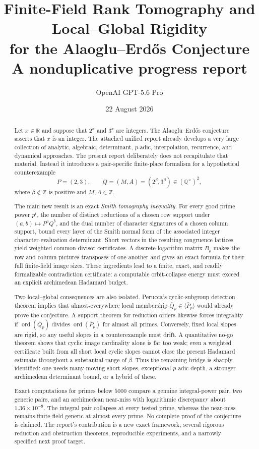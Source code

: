 \documentclass[11pt]{article}
\title{\bfseries Finite-Field Rank Tomography and Local--Global Rigidity\\[4pt]
for the Alaoglu--Erd\H{o}s Conjecture\\[10pt]
\large A nonduplicative progress report}
\author{OpenAI GPT-5.6 Pro}
\date{22 August 2026}
\theoremstyle{definition}
\theoremstyle{remark}
\newcommand{\Z}{\mathbb Z}
\newcommand{\Q}{\mathbb Q}
\newcommand{\R}{\mathbb R}
\newcommand{\ord}{\operatorname{ord}}
\begin{document}
\maketitle

\begin{abstract}
Let $x\in\R$ and suppose that $2^x$ and $3^x$ are integers.  The Alaoglu--Erd\H{o}s conjecture asserts that $x$ is an integer.  The attached unified report already develops a very large collection of analytic, algebraic, determinant, $p$-adic, interpolation, recurrence, and dynamical approaches.  The present report deliberately does not recapitulate that material.  Instead it introduces a pair-specific finite-place formalism for a hypothetical counterexample
\[
P=(2,3),\qquad Q=(M,A)=(2^\beta,3^\beta)\in(\Q^\times)^2,
\]
where $\beta\notin\Z$ is positive and $M,A\in\Z$.

The main new result is an exact \emph{Smith tomography inequality}.  For every good prime power $p^t$, the number of distinct reductions of a chosen row support under $(a,b)\mapsto P^aQ^b$, and the dual number of character signatures of a chosen column support, bound every layer of the Smith normal form of the associated integer character-evaluation determinant.  Short vectors in the resulting congruence lattices yield weighted common-divisor certificates.  A discrete-logarithm matrix $B_p$ makes the row and column pictures transposes of one another and gives an exact formula for their full finite-field image sizes.  These ingredients lead to a finite, exact, and readily formalizable contradiction certificate: a computable orbit-collapse energy must exceed an explicit archimedean Hadamard budget.

Two local--global consequences are also isolated.  Perucca's cyclic-subgroup detection theorem implies that almost-everywhere local membership $\bar Q_p\in\langle\bar P_p\rangle$ would already prove the conjecture.  A support theorem for reduction orders likewise forces integrality if $\ord(\bar Q_p)$ divides $\ord(\bar P_p)$ for almost all primes.  Conversely, fixed local slopes are rigid, so any useful slopes in a counterexample must drift.  A quantitative no-go theorem shows that cyclic image cardinality alone is far too weak; even a weighted certificate built from all short local cyclic slopes cannot close the present Hadamard estimate throughout a substantial range of $\beta$.  Thus the remaining bridge is sharply identified: one needs many moving short slopes, exceptional $p$-adic depth, a stronger archimedean determinant bound, or a hybrid of these.

Exact computations for primes below $5000$ compare a genuine integral-power pair, two generic pairs, and an archimedean near-miss with logarithmic discrepancy about $1.36\times10^{-9}$.  The integral pair collapses at every tested prime, whereas the near-miss remains finite-field generic at almost every prime.  No complete proof of the conjecture is claimed.  The report's contribution is a new exact framework, several rigorous reduction and obstruction theorems, reproducible experiments, and a narrowly specified next proof target.
\end{abstract}
\end{document}
